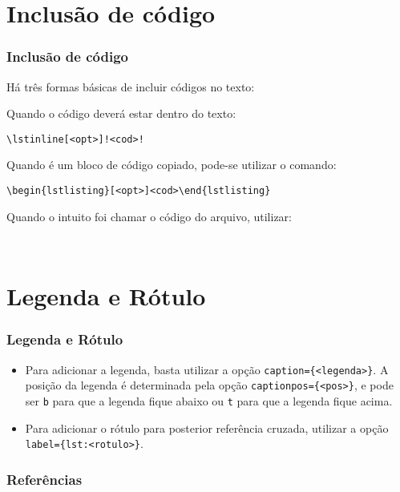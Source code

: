 \documentclass[brazilian]{beamer}
\begin{document}
\section{Inclusão de código}
\begin{frame}[fragile]
    \frametitle{Inclusão de código}

Há três formas básicas de incluir códigos no texto: 

Quando o código deverá estar dentro do texto: 
\begin{lstlisting}[style=myStyleLatex, numbers=none]
    \lstinline[<opt>]!<cod>!
\end{lstlisting}
Quando é um bloco de código copiado, pode-se utilizar o comando:

\lstinline[style=myStyleLatex,]!\begin{lstlisting}[<opt>]<cod>\end{lstlisting}!

Quando o intuito foi chamar o código do arquivo, utilizar:
\begin{lstlisting}[style=myStyleLatex, numbers=none]
    
\end{lstlisting}
\end{frame}

\section{Legenda e Rótulo}
\begin{frame}[fragile]
    \frametitle{Legenda e Rótulo}

    \begin{itemize}
        \item Para adicionar a legenda, basta utilizar a opção \texttt{caption=\{<legenda>\}}. A posição da legenda é determinada pela opção \texttt{captionpos=\{<pos>\}}, e pode ser \texttt{b} para que a legenda fique abaixo ou \texttt{t} para que a legenda fique acima.
        \item  Para adicionar o rótulo para posterior referência cruzada, utilizar a opção \texttt{label=\{lst:<rotulo>\}}.
    \end{itemize}

\end{frame}

\begin{frame}[allowframebreaks]
    \frametitle{Referências}

    \nocite{*}
    \printbibliography[keyword={inserirCodigos}]

\end{frame}
\end{document}

